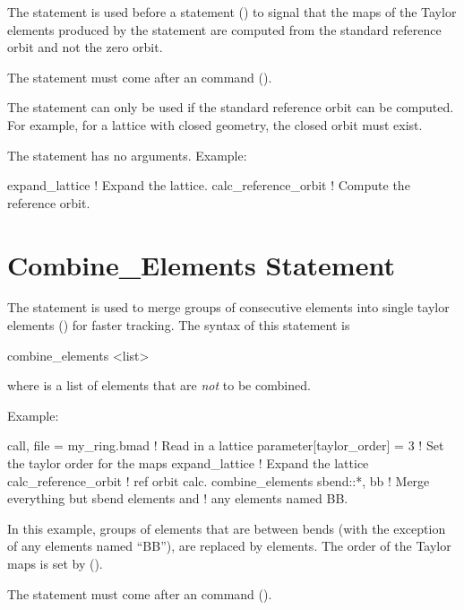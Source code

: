 {{{{{The  statement is used before a  statement
() to signal that the maps of the Taylor elements produced by the
 statement are computed from the standard reference orbit and not the zero
orbit.

The  statement must come after an  command
().

The  statement can only be used if the standard reference orbit can
be computed. For example, for a lattice with closed geometry, the closed orbit must exist.

The  statement has no arguments. Example:
\begin{example}
  expand_lattice          ! Expand the lattice.
  calc_reference_orbit    ! Compute the reference orbit.
\end{example}

\section{Combine_Elements Statement}
\label{s:combine.eles}

The  statement is used to merge groups of consecutive elements into single
taylor elements () for faster tracking. The syntax of this statement is
\begin{example}
  combine_elements <list>
\end{example}
where  is a list of elements that are {\em not} to be combined.

Example:
\begin{example}
  call, file = my_ring.bmad     ! Read in a lattice
  parameter[taylor_order] = 3   ! Set the taylor order for the maps
  expand_lattice                ! Expand the lattice
  calc_reference_orbit          ! ref orbit calc.
  combine_elements sbend::*, bb ! Merge everything but sbend elements and 
                                !   any elements named BB.
\end{example}
In this example, groups of elements that are between bends (with the exception of any elements named
``BB''), are replaced by  elements. The order of the Taylor maps is set by
 ().

The  statement must come after an  command
().

}}}}}
